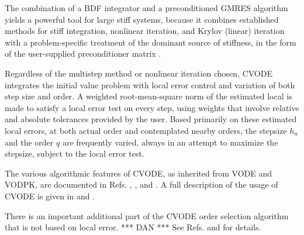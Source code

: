The combination of a BDF integrator and a preconditioned GMRES
algorithm yields a powerful tool for large stiff systems, because it
combines established methods for stiff integration, nonlinear
iteration, and Krylov (linear) iteration with a problem-specific
treatment of the dominant source of stiffness, in the form of the
user-supplied preconditioner matrix \cite{BrHi:89}.

Regardless of the multistep method or nonlinear iteration chosen,
CVODE integrates the initial value problem with local error control
and variation of both step size and order.  A weighted root-mean-square
norm of the estimated local is made to satisfy a local error test on
every step, using weights that involve relative and absolute
tolerances provided by the user.  Based primarily on these estimated
local errors, at both actual order and contemplated nearby orders, the
stepsize $h_n$ and the order $q$ are frequently varied, always in an
attempt to maximize the stepsize, subject to the local error test.

The various algorithmic features of CVODE, as inherited from VODE and
VODPK, are documented in Refs. \cite{BBH:89}, \cite{Byr:92}, and
\cite{Hin:00}.  A full description of the usage of CVODE is given in
\cite{CoHi:94} and \cite{ByHi:98}.

There is an important additional part of the CVODE order selection
algorithm that is not based on local error.  
*** DAN *** 
See Refs. \cite{Hin:92} and \cite{Hin:95} for details.

